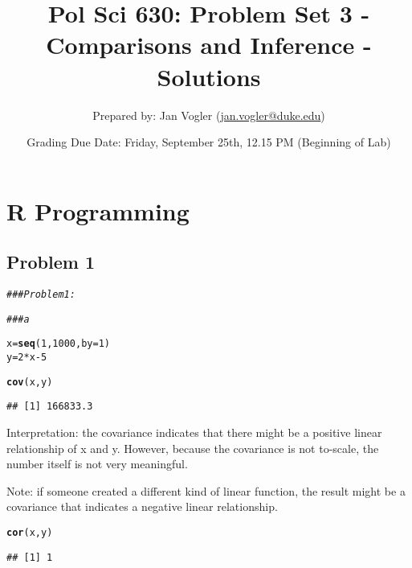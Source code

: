 \documentclass[12pt,letter]{article}\usepackage[]{graphicx}\usepackage[]{color}
\makeatletter
\newcommand{\hlnum}[1]{\textcolor[rgb]{0.686,0.059,0.569}{#1}}%
\newcommand{\hlcom}[1]{\textcolor[rgb]{0.678,0.584,0.686}{\textit{#1}}}%
\newcommand{\hlopt}[1]{\textcolor[rgb]{0,0,0}{#1}}%
\newcommand{\hlstd}[1]{\textcolor[rgb]{0.345,0.345,0.345}{#1}}%
\newcommand{\hlkwb}[1]{\textcolor[rgb]{0.69,0.353,0.396}{#1}}%
\newcommand{\hlkwc}[1]{\textcolor[rgb]{0.333,0.667,0.333}{#1}}%
\newcommand{\hlkwd}[1]{\textcolor[rgb]{0.737,0.353,0.396}{\textbf{#1}}}%
\newenvironment{kframe}{%
 \def\at@end@of@kframe{}%
 \ifinner\ifhmode%
  \def\at@end@of@kframe{\end{minipage}}%
  \begin{minipage}{\columnwidth}%
 \fi\fi%
 \def\FrameCommand##1{\hskip\@totalleftmargin \hskip-\fboxsep
 \colorbox{shadecolor}{##1}\hskip-\fboxsep
     \hskip-\linewidth \hskip-\@totalleftmargin \hskip\columnwidth}%
 \MakeFramed {\advance\hsize-\width
   \@totalleftmargin\z@ \linewidth\hsize
   \@setminipage}}%
 {\par\unskip\endMakeFramed%
 \at@end@of@kframe}
\newenvironment{knitrout}{}{} %
\makeatother
\begin{document}
\title{Pol Sci 630: Problem Set 3 - Comparisons and Inference - Solutions}

\author{Prepared by: Jan Vogler (\href{mailto:jan.vogler@duke.edu}{jan.vogler@duke.edu})}

\date{Grading Due Date: Friday, September 25th, 12.15 PM (Beginning of Lab)}
 
\maketitle



\section*{R Programming}

\subsection*{Problem 1}

\begin{knitrout}
\color{fgcolor}\begin{kframe}
\begin{alltt}
\hlcom{### Problem 1:}

\hlcom{### a}

\hlstd{x} \hlkwb{=} \hlkwd{seq}\hlstd{(}\hlnum{1}\hlstd{,} \hlnum{1000}\hlstd{,} \hlkwc{by} \hlstd{=} \hlnum{1}\hlstd{)}
\hlstd{y} \hlkwb{=} \hlnum{2} \hlopt{*} \hlstd{x} \hlopt{-} \hlnum{5}

\hlkwd{cov}\hlstd{(x, y)}
\end{alltt}
\begin{verbatim}
## [1] 166833.3
\end{verbatim}
\end{kframe}
\end{knitrout}

Interpretation: the covariance indicates that there might be a positive linear relationship of x and y. However, because the covariance is not to-scale, the number itself is not very meaningful.

Note: if someone created a different kind of linear function, the result might be a covariance that indicates a negative linear relationship.

\begin{knitrout}
\color{fgcolor}\begin{kframe}
\begin{alltt}
\hlkwd{cor}\hlstd{(x, y)}
\end{alltt}
\begin{verbatim}
## [1] 1
\end{verbatim}
\end{kframe}
\end{knitrout}
\end{document}
